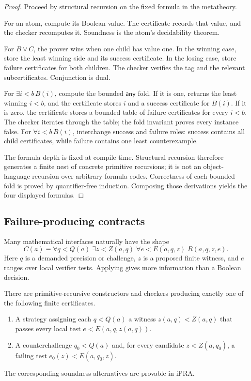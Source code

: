 \begin{proof}
Proceed by structural recursion on the fixed formula in the metatheory.

For an atom, compute its Boolean value.  The certificate records that value, and the checker recomputes it.  Soundness is the atom's decidability theorem.

For \(B\vee C\), the prover wins when one child has value one.  In the winning case, store the least winning side and its success certificate.  In the losing case, store failure certificates for both children.  The checker verifies the tag and the relevant subcertificates.  Conjunction is dual.

For \(\exists i<b\,B(i)\), compute the bounded \(\mathsf{any}\) fold.  If it is one,  returns the least winning \(i<b\), and the certificate stores \(i\) and a success certificate for \(B(i)\).  If it is zero, the certificate stores a bounded table of failure certificates for every \(i<b\).  The checker iterates through the table; the fold invariant proves every instance false.  For \(\forall i<b\,B(i)\), interchange success and failure roles: success contains all child certificates, while failure contains one least counterexample.

The formula depth is fixed at compile time.  Structural recursion therefore generates a finite nest of concrete primitive recursions; it is not an object-language recursion over arbitrary formula codes.  Correctness of each bounded fold is proved by quantifier-free induction.  Composing those derivations yields the four displayed formulas.
\end{proof}

\subsection{Failure-producing contracts}

Many mathematical interfaces naturally have the shape
\[
 C(a)\equiv \forall q<Q(a)\;\exists z<Z(a,q)\;\forall e<E(a,q,z)\;R(a,q,z,e).
\]
Here \(q\) is a demanded precision or challenge, \(z\) is a proposed finite witness, and \(e\) ranges over local verifier tests.  Applying  gives more information than a Boolean decision.

\begin{corollary}
There are primitive-recursive constructors and checkers producing exactly one of the following finite certificates.
\begin{enumerate}
\item A strategy assigning each \(q<Q(a)\) a witness \(z(a,q)<Z(a,q)\) that passes every local test \(e<E(a,q,z(a,q))\).
\item A counterchallenge \(q_0<Q(a)\) and, for every candidate \(z<Z(a,q_0)\), a failing test \(e_0(z)<E(a,q_0,z)\).
\end{enumerate}
The corresponding soundness alternatives are provable in iPRA.
\end{corollary}

